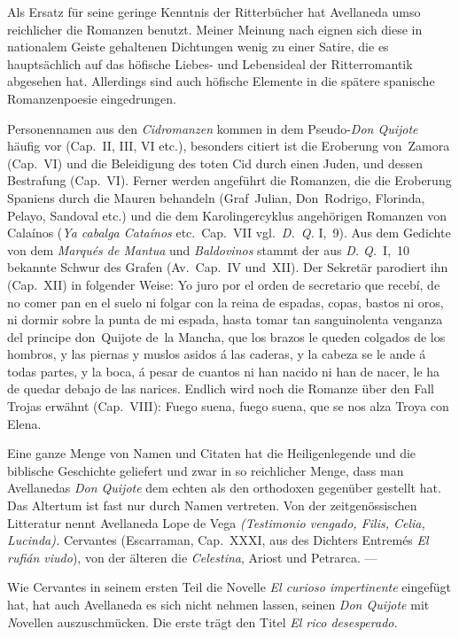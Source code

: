 Als Ersatz für seine geringe Kenntnis der Ritterbücher hat Avellaneda
umso reichlicher die Romanzen benutzt. Meiner Meinung nach
eignen sich diese in nationalem Geiste gehaltenen Dichtungen wenig zu
einer Satire, die es hauptsächlich auf das höfische Liebes- und Lebensideal
der Ritterromantik abgesehen hat. Allerdings sind auch höfische
Elemente in die spätere spanische Romanzenpoesie eingedrungen.

Personennamen aus den {\it Cidromanzen} kommen in dem Pseudo-{\it Don
Quijote} häufig vor (Cap.~II, III, VI etc.), besonders citiert ist die Eroberung
von~Zamora (Cap.~VI) und die Beleidigung des toten Cid durch einen Juden,
und dessen Bestrafung (Cap.~VI). Ferner werden angeführt die Romanzen,
die die Eroberung Spaniens durch die Mauren behandeln (Graf~Julian,
Don~Rodrigo, Florinda, Pelayo, Sandoval etc.) und die dem Karolingercyklus
angehörigen Romanzen von Calaínos ({\it\spanish Ya cabalga Cataínos}
etc.\ Cap.~VII vgl.\ {\it D.~Q.} I,~9). Aus dem Gedichte von dem {\it Marqués de
Mantua} und {\it Baldovinos} stammt der aus {\it D. Q.}~I,~10 bekannte Schwur
des Grafen (Av.~Cap.~IV und~XII). Der Sekretär parodiert ihn (Cap.~XII)
in folgender Weise: {\itquoted\spanish Yo juro por el orden de secretario que recebí, de
no comer pan en el suelo ni folgar con la reina de espadas, copas,
bastos ni oros, ni dormir sobre la punta de mi espada, hasta tomar tan
sanguinolenta venganza del principe don~Quijote de~la Mancha, que
los brazos le queden colgados de los hombros, y las piernas y muslos
asidos á las caderas, y la cabeza se le ande á todas partes, y la boca,
á pesar de cuantos ni han nacido ni han de nacer, le ha de quedar
debajo de las narices.} Endlich wird noch die Romanze über den Fall
Trojas erwähnt (Cap.~VIII): {\itquoted\spanish Fuego suena, fuego suena, que se nos alza
Troya con Elena.}

Eine ganze Menge von Namen und Citaten hat die Heiligenlegende
und die biblische Geschichte geliefert und zwar in so reichlicher Menge,
dass man Avellanedas {\it Don Quijote} dem echten als den orthodoxen
gegenüber gestellt hat. Das Altertum ist fast nur durch Namen vertreten.
Von der zeitgenössischen Litteratur nennt Avellaneda Lope de
Vega {\it (Testimonio vengado, Filis, Celia, Lucinda).} Cervantes (Escarraman,
Cap.~XXXI, aus des Dichters Entremés {\it El rufián viudo\/}), von der älteren
die {\it Celestina}, Ariost und Petrarca. ---

\blankline

Wie Cervantes in seinem ersten Teil die Novelle {\it\spanish El curioso impertinente}
eingefügt hat, hat auch Avellaneda es sich nicht nehmen lassen,
seinen {\it Don Quijote} mit {\emph Novellen} auszuschmücken. Die erste trägt
den Titel {\it\spanish El rico desesperado.}

